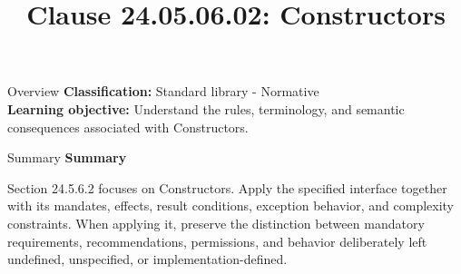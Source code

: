 \documentclass[10pt,letterpaper]{article}
\title{Clause 24.05.06.02: Constructors}
\author{}
\date{}
\begin{document}
\maketitle
\begin{CornellOverviewBox}{Overview}
\textbf{Classification:} Standard library - Normative\\[2pt]
\textbf{Learning objective:} Understand the rules, terminology, and semantic consequences associated with Constructors.
\end{CornellOverviewBox}\begin{CornellSummaryBox}{Summary}
{\sffamily\bfseries\color{Accent} Summary}\par\vspace{3pt}Section 24.5.6.2 focuses on Constructors. Apply the specified interface together with its mandates, effects, result conditions, exception behavior, and complexity constraints. When applying it, preserve the distinction between mandatory requirements, recommendations, permissions, and behavior deliberately left undefined, unspecified, or implementation-defined.
\end{CornellSummaryBox}
\end{document}
